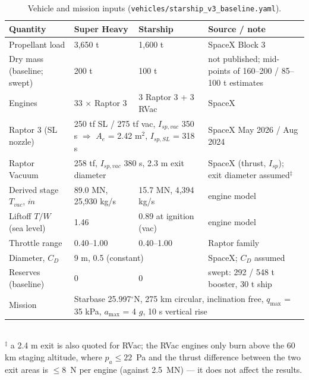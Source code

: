\documentclass[11pt,a4paper]{article}
\begin{document}
\begin{table}[h]\centering\footnotesize
\caption{Vehicle and mission inputs (\texttt{vehicles/starship\_v3\_baseline.yaml}).}
\label{tab:inputs}
\begin{tabular}{p{3.1cm}p{3.6cm}p{3.6cm}p{4.6cm}}
\toprule
Quantity & Super Heavy & Starship & Source / note \\
\midrule
Propellant load & 3,650 t & 1,600 t & SpaceX Block 3 \\
Dry mass (baseline; swept) & 200 t & 100 t & not published; mid-points of 160--200 / 85--100 t estimates \\
Engines & 33 $\times$ Raptor 3 & 3 Raptor 3 + 3 RVac & SpaceX \\
Raptor 3 (SL nozzle) & \multicolumn{2}{p{7.4cm}}{250 tf SL / 275 tf vac, $I_{sp,vac}$ 350 s $\Rightarrow$ $A_e$ = 2.42 m$^2$, $I_{sp,SL}$ = 318 s} & SpaceX May 2026 / Aug 2024 \\
Raptor Vacuum & \multicolumn{2}{p{7.4cm}}{258 tf, $I_{sp,vac}$ 380 s, 2.3 m exit diameter} & SpaceX (thrust, $I_{sp}$); exit diameter assumed$^{\ddagger}$ \\
Derived stage $T_{vac}$, $\dot m$ & 89.0 MN, 25,930 kg/s & 15.7 MN, 4,394 kg/s & engine model \\
Liftoff $T/W$ (sea level) & 1.46 & 0.89 at ignition (vac) & engine model \\
Throttle range & 0.40--1.00 & 0.40--1.00 & Raptor family \\
Diameter, $C_D$ & \multicolumn{2}{l}{9 m, 0.5 (constant)} & SpaceX; $C_D$ assumed \\
Reserves (baseline) & 0 & 0 & swept: 292 / 548 t booster, 30 t ship \\
Mission & \multicolumn{3}{p{12cm}}{Starbase 25.997$^\circ$N, 275 km circular, inclination free, $q_{\max}$ = 35 kPa, $a_{\max}$ = 4 $g$, 10 s vertical rise} \\
\bottomrule
\end{tabular}\\[2pt]
{\footnotesize $^{\ddagger}$ a 2.4 m exit is also quoted for RVac; the RVac engines only burn above the 60 km staging altitude, where $p_a \le 22$~Pa and the thrust difference between the two exit areas is $\le 8$~N per engine (against 2.5~MN) --- it does not affect the results.}
\end{table}
\end{document}
